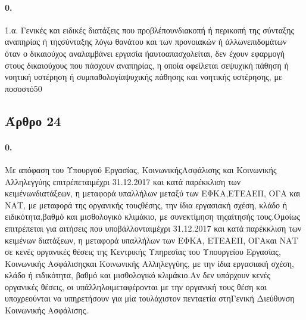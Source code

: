 \documentclass[a4paper,oneside, 10pt]{book}
\begin{document}
\paragraph { 0. } 1.α. Γενικές και ειδικές διατάξεις που προβλέπουνδιακοπή ή περικοπή της σύνταξης αναπηρίας ή τηςσύνταξης λόγω θανάτου και των προνοιακών ή άλλωνεπιδομάτων όταν ο δικαιούχος αναλαμβάνει εργασία ήαυτοαπασχολείται, δεν έχουν εφαρμογή στους δικαιούχους που πάσχουν αναπηρίας, η οποία οφείλεται σεψυχική πάθηση ή νοητική υστέρηση ή συμπαθολογίαψυχικής πάθησης και νοητικής υστέρησης, με ποσοστό50%
\subsection*{ Άρθρο 24 }
\paragraph { 0. } Με απόφαση του Υπουργού Εργασίας, ΚοινωνικήςΑσφάλισης και Κοινωνικής Αλληλεγγύης επιτρέπεταιμέχρι 31.12.2017 και κατά παρέκκλιση των κειμένωνδιατάξεων, η μεταφορά υπαλλήλων μεταξύ των ΕΦΚΑ,ΕΤΕΑΕΠ, ΟΓΑ και ΝΑΤ, με μεταφορά της οργανικής τουςθέσης, την ίδια εργασιακή σχέση, κλάδο ή ειδικότητα,βαθμό και μισθολογικό κλιμάκιο, με συνεκτίμηση τηςαίτησής τους.Ομοίως επιτρέπεται για αιτήσεις που υποβάλλονταιμέχρι 31.12.2017 και κατά παρέκκλιση των κειμένων διατάξεων, η μεταφορά υπαλλήλων των ΕΦΚΑ, ΕΤΕΑΕΠ, ΟΓΑκαι ΝΑΤ σε κενές οργανικές θέσεις της Κεντρικής Υπηρεσίας του Υπουργείου Εργασίας, Κοινωνικής Ασφάλισηςκαι Κοινωνικής Αλληλεγγύης, με την ίδια εργασιακή σχέση, κλάδο ή ειδικότητα, βαθμό και μισθολογικό κλιμάκιο.Αν δεν υπάρχουν κενές οργανικές θέσεις, οι υπάλληλοιμεταφέρονται με την οργανική τους θέση και υποχρεούνται να υπηρετήσουν για μία τουλάχιστον πενταετία στηΓενική Διεύθυνση Κοινωνικής Ασφάλισης.
\end{document}
